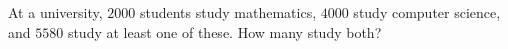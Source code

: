 At a university, $2000$ students study mathematics, $4000$ study computer science, and $5580$ study at least one of these. How many study both?
